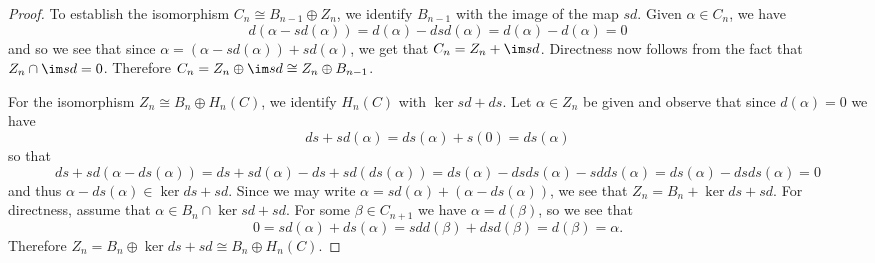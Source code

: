 \documentclass[10pt]{amsart}
\begin{document}
\begin{lem}
\begin{proof}
    To establish the isomorphism $C_n \cong B_{n-1} \oplus Z_n$, we identify $B_{n-1}$ with the image of the map $sd$.
    Given $\alpha \in C_n$, we have
    $$d(\alpha - sd(\alpha)) = d(\alpha) - dsd(\alpha) = d(\alpha) - d(\alpha) = 0$$
    and so we see that since $\alpha = (\alpha - sd(\alpha)) + sd(\alpha)$, we get that $C_n = Z_n + \im sd$.
    Directness now follows from the fact that $Z_n \cap \im sd = 0$.
    Therefore $C_n = Z_n \oplus \im sd \cong Z_n \oplus B_{n-1}$.

    For the isomorphism $Z_n \cong B_n \oplus H_n(C)$, we identify $H_n(C)$ with $\ker sd + ds$.
    Let $\alpha \in Z_n$ be given and observe that since $d(\alpha) = 0$ we have
    $$ds + sd(\alpha) = ds(\alpha) + s(0) = ds(\alpha)$$
    so that 
    $$ds + sd(\alpha - ds(\alpha)) = ds + sd(\alpha) - ds + sd(ds(\alpha)) = ds(\alpha) - dsds(\alpha) - sdds(\alpha) = ds(\alpha) - dsds(\alpha) = 0$$
    and thus $\alpha - ds(\alpha) \in \ker ds + sd$.
    Since we may write $\alpha = sd(\alpha) + (\alpha - ds(\alpha))$, we see that $Z_n = B_n + \ker ds + sd$.
    For directness, assume that $\alpha \in B_n \cap \ker sd + sd$.
    For some $\beta \in C_{n+1}$ we have $\alpha = d(\beta)$, so we see that
    $$0 = sd(\alpha) + ds(\alpha) = sdd(\beta) + dsd(\beta) = d(\beta) = \alpha.$$
    Therefore $Z_n = B_n \oplus \ker ds + sd \cong B_n \oplus H_n(C)$.
  \end{proof}
\end{lem}
\end{document}
